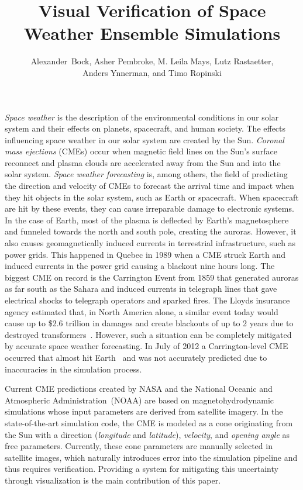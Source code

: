 \documentclass[journal]{vgtc}                %
\title{Visual Verification of Space Weather Ensemble Simulations}
\author{
    Alexander~Bock,
    Asher Pembroke,
    M. Leila Mays,
    Lutz Rastaetter,\\%
    Anders Ynnerman,
    and Timo Ropinski%
}
\begin{document}
\maketitle
\emph{Space weather} is the description of the environmental conditions in our solar system and their effects on planets, spacecraft, and human society. The effects influencing space weather in our solar system are created by the Sun. \emph{Coronal mass ejections} (CMEs) occur when magnetic field lines on the Sun's surface reconnect and plasma clouds are accelerated away from the Sun and into the solar system. \emph{Space weather forecasting} is, among others, the field of predicting the direction and velocity of CMEs to forecast the arrival time and impact when they hit objects in the solar system, such as Earth or spacecraft. When spacecraft are hit by these events, they can cause irreparable damage to electronic systems. In the case of Earth, most of the plasma is deflected by Earth's magnetosphere and funneled towards the north and south pole, creating the auroras. However, it also causes geomagnetically induced currents in terrestrial infrastructure, such as power grids. This happened in Quebec in 1989 when a CME struck Earth and induced currents in the power grid causing a blackout nine hours long. The biggest CME on record is the Carrington Event from 1859 that generated auroras as far south as the Sahara and induced currents in telegraph lines that gave electrical shocks to telegraph operators and sparked fires. The Lloyds insurance agency estimated that, in North America alone, a similar event today would cause up to \$2.6 trillion in damages and create blackouts of up to 2 years due to destroyed transformers~\cite{lloyds2013impact}. However, such a situation can be completely mitigated by accurate space weather forecasting. In July of 2012 a Carrington-level CME occurred that almost hit Earth~\cite{baker2013major} and was not accurately predicted due to inaccuracies in the simulation process.

Current CME predictions created by NASA and the National Oceanic and Atmospheric Administration~(NOAA) are based on magnetohydrodynamic simulations whose input parameters are derived from satellite imagery. In the state-of-the-art simulation code, the CME is modeled as a cone originating from the Sun with a direction (\emph{longitude} and \emph{latitude}), \emph{velocity}, and \emph{opening angle} as free parameters. Currently, these cone parameters are manually selected in satellite images, which naturally introduces error into the simulation pipeline and thus requires verification. Providing a system for mitigating this uncertainty through visualization is the main contribution of this paper.
\end{document}
